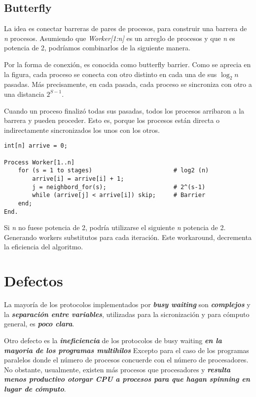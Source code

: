 \documentclass[a4paper, 10pt, margin=0in]{report}
\begin{document}
\subsection{Butterfly}
La idea es conectar barreras de pares de procesos, para construir una barrera de \emph{n} procesos. Asumiendo que \emph{Worker[1:n]} es un arreglo de procesos y que \emph{n} es potencia de 2, podríamos combinarlos de la siguiente manera.

Por la forma de conexión, es conocida como butterfly barrier. Como se aprecia en la figura, cada proceso se conecta con otro distinto en cada una de sus $\log_2n$ pasadas. Más precisamente, en cada pasada, cada proceso se sincroniza con otro a una distancia $2^{S-1}$.

Cuando un proceso finalizó todas sus pasadas, todos los procesos arribaron a la barrera y pueden proceder. Esto es, porque los procesos están directa o indirectamente sincronizados los unos con los otros.

\begin{lstlisting}
int[n] arrive = 0;

Process Worker[1..n]
    for (s = 1 to stages)                       # log2 (n)
        arrive[i] = arrive[i] + 1;
        j = neighbord_for(s);                   # 2^(s-1)
        while (arrive[j] < arrive[i]) skip;     # Barrier
    end;
End.
\end{lstlisting}

Si \emph{n} no fuese potencia de 2, podría utilizarse el siguiente \emph{n} potencia de 2. Generando workers substitutos para cada iteración. Este workaround, decrementa la eficiencia del algoritmo.

\section{Defectos}

La mayoría de los protocolos implementados por \textbf{\emph{busy waiting}} son \textbf{\emph{complejos}} y la \textbf{\emph{separación entre variables}}, utilizadas para la sicronización y para cómputo general, es \textbf{\emph{poco clara}}.

Otro defecto es la \textbf{\emph{ineficiencia}} de los protocolos de busy waiting \textbf{\emph{en la mayoria de los programas multihilos}} Excepto para el caso de los programas paralelos donde el número de procesos concuerde con el número de procesadores. No obstante, usualmente, existen más procesos que procesadores y \textbf{\emph{resulta menos productivo otorgar CPU a procesos para que hagan spinning en lugar de cómputo}}.
\end{document}
